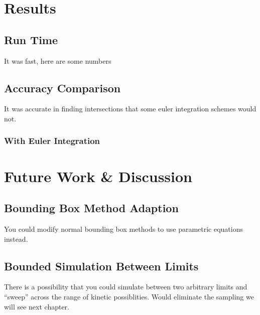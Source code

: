 \section{Results}

	\subsection{Run Time}

	It was fast, here are some numbers

	\subsection{Accuracy Comparison}

	It was accurate in finding intersections that some euler integration schemes would not.

		\subsubsection{With Euler Integration}

\section{Future Work \& Discussion}

	\subsection{Bounding Box Method Adaption}

	You could modify normal bounding box methods to use parametric equations instead.

	\subsection{Bounded Simulation Between Limits}

	There is a possibility that you could simulate between two arbitrary limits and ``sweep'' across the range of kinetic possiblities. Would eliminate the sampling we will see next chapter.
